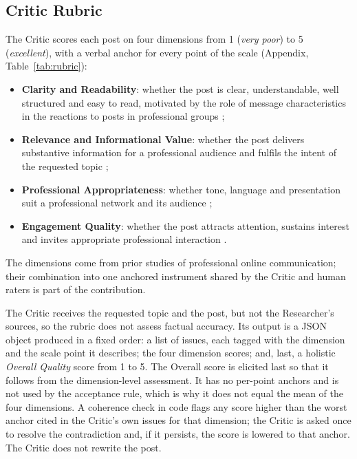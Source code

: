 \documentclass[a4paper,twoside]{article}
\begin{document}
\subsection{Critic Rubric}
\label{sec:rubric}

The Critic scores each post on four dimensions from 1 (\emph{very poor}) to 5 (\emph{excellent}), with a verbal anchor for every point of the scale (Appendix, Table~\ref{tab:rubric}):

\begin{itemize}
\item \textbf{Clarity and Readability}: whether the post is clear, understandable, well structured and easy to read, motivated by the role of message characteristics in the reactions to posts in professional groups \cite{rooderkerk2016nocomment};
\item \textbf{Relevance and Informational Value}: whether the post delivers substantive information for a professional audience and fulfils the intent of the requested topic \cite{usera2026linkedin};
\item \textbf{Professional Appropriateness}: whether tone, language and presentation suit a professional network and its audience \cite{usera2026linkedin};
\item \textbf{Engagement Quality}: whether the post attracts attention, sustains interest and invites appropriate professional interaction \cite{usera2025predicts}.
\end{itemize}

The dimensions come from prior studies of professional online communication; their combination into one anchored instrument shared by the Critic and human raters is part of the contribution.

The Critic receives the requested topic and the post, but not the Researcher's sources, so the rubric does not assess factual accuracy. Its output is a JSON object produced in a fixed order: a list of issues, each tagged with the dimension and the scale point it describes; the four dimension scores; and, last, a holistic \emph{Overall Quality} score from 1 to 5. The Overall score is elicited last so that it follows from the dimension-level assessment. It has no per-point anchors and is not used by the acceptance rule, which is why it does not equal the mean of the four dimensions. A coherence check in code flags any score higher than the worst anchor cited in the Critic's own issues for that dimension; the Critic is asked once to resolve the contradiction and, if it persists, the score is lowered to that anchor. The Critic does not rewrite the post.
\end{document}
